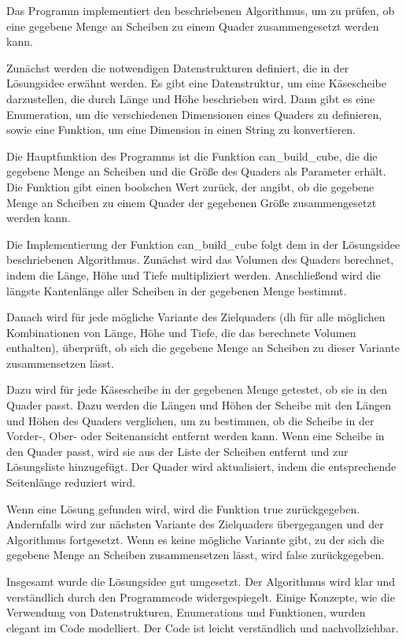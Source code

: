 \documentclass[a4paper,10pt,ngerman]{scrartcl}
\begin{document}
    Das Programm implementiert den beschriebenen Algorithmus, um zu prüfen, ob eine gegebene Menge an Scheiben zu einem Quader zusammengesetzt werden kann.

    Zunächst werden die notwendigen Datenstrukturen definiert, die in der Lösungsidee erwähnt werden.
    Es gibt eine Datenstruktur, um eine Käsescheibe darzustellen, die durch Länge und Höhe beschrieben wird.
    Dann gibt es eine Enumeration, um die verschiedenen Dimensionen eines Quaders zu definieren, sowie eine Funktion, um eine Dimension in einen String zu konvertieren.

    Die Hauptfunktion des Programms ist die Funktion can_build_cube, die die gegebene Menge an Scheiben und die Größe des Quaders als Parameter erhält.
    Die Funktion gibt einen boolschen Wert zurück, der angibt, ob die gegebene Menge an Scheiben zu einem Quader der gegebenen Größe zusammengesetzt werden kann.

    Die Implementierung der Funktion can_build_cube folgt dem in der Lösungsidee beschriebenen Algorithmus.
    Zunächst wird das Volumen des Quaders berechnet, indem die Länge, Höhe und Tiefe multipliziert werden.
    Anschließend wird die längste Kantenlänge aller Scheiben in der gegebenen Menge bestimmt.

    Danach wird für jede mögliche Variante des Zielquaders (dh für alle möglichen Kombinationen von Länge, Höhe und Tiefe, die das berechnete Volumen enthalten), überprüft, ob sich die gegebene Menge an Scheiben zu dieser Variante zusammensetzen lässt.

    Dazu wird für jede Käsescheibe in der gegebenen Menge getestet, ob sie in den Quader passt.
    Dazu werden die Längen und Höhen der Scheibe mit den Längen und Höhen des Quaders verglichen, um zu bestimmen, ob die Scheibe in der Vorder-, Ober- oder Seitenansicht entfernt werden kann.
    Wenn eine Scheibe in den Quader passt, wird sie aus der Liste der Scheiben entfernt und zur Lösungsliste hinzugefügt.
    Der Quader wird aktualisiert, indem die entsprechende Seitenlänge reduziert wird.

    Wenn eine Lösung gefunden wird, wird die Funktion true zurückgegeben.
    Andernfalls wird zur nächsten Variante des Zielquaders übergegangen und der Algorithmus fortgesetzt.
    Wenn es keine mögliche Variante gibt, zu der sich die gegebene Menge an Scheiben zusammensetzen lässt, wird false zurückgegeben.

    Insgesamt wurde die Lösungsidee gut umgesetzt.
    Der Algorithmus wird klar und verständlich durch den Programmcode widergespiegelt.
    Einige Konzepte, wie die Verwendung von Datenstrukturen, Enumerations und Funktionen, wurden elegant im Code modelliert.
    Der Code ist leicht verständlich und nachvollziehbar.
\end{document}
